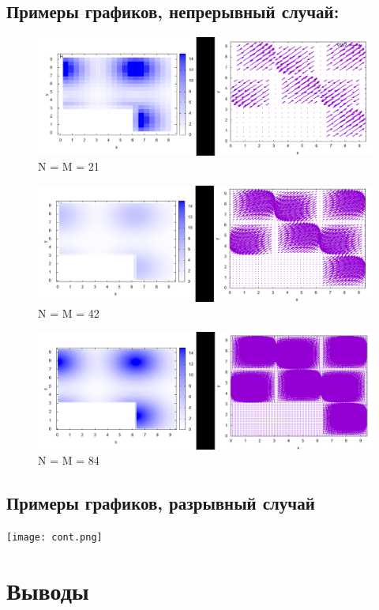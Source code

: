 \documentclass[a4paper,11pt]{article}
\begin{document}
\subsection{Примеры графиков, непрерывный случай:}
\begin{figure}[H]
\centering
\includegraphics[width=1.0\textwidth]{cont_21.png}
\caption{N = M = 21}
\end{figure}
\begin{figure}[H]
\centering
\includegraphics[width=1.0\textwidth]{cont_42.png}
\caption{N = M = 42}
\end{figure}
\begin{figure}[H]
\centering
\includegraphics[width=1.0\textwidth]{cont_84.png}
\caption{N = M = 84}
\end{figure}

\subsection{Примеры графиков, разрывный случай}
\texttt{[image: cont.png]}

\section{Выводы}
\end{document}
